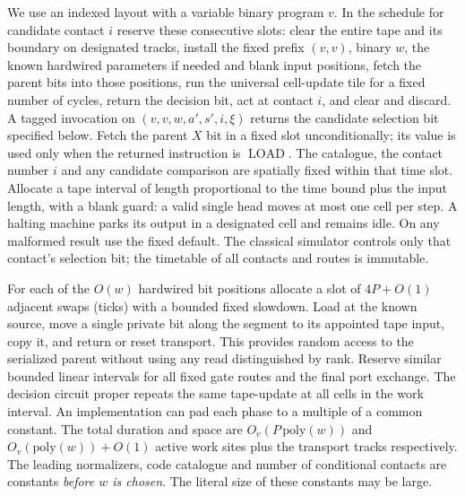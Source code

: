 We use an indexed layout with a variable binary program \(v\). In the schedule for candidate contact \(i\) reserve these consecutive slots: clear the entire tape and its boundary on designated tracks, install the fixed prefix \((v,v)\), binary \(w\), the known hardwired parameters if needed and blank input positions, fetch the parent bits into those positions, run the universal cell-update tile for a fixed number of cycles, return the decision bit, act at contact \(i\), and clear and discard. A tagged invocation on \((v,v,w,a',s',i,\xi)\) returns the candidate selection bit specified below. Fetch the parent \(X\) bit in a fixed slot unconditionally; its value is used only when the returned instruction is \(\operatorname{LOAD}\). The catalogue, the contact number \(i\) and any candidate comparison are spatially fixed within that time slot. Allocate a tape interval of length proportional to the time bound plus the input length, with a blank guard: a valid single head moves at most one cell per step. A halting machine parks its output in a designated cell and remains idle. On any malformed result use the fixed default. The classical simulator controls only that contact's selection bit; the timetable of all contacts and routes is immutable.

For each of the \(O(w)\) hardwired bit positions allocate a slot of \(4P+O(1)\) adjacent swaps (ticks) with a bounded fixed slowdown. Load at the known source, move a single private bit along the segment to its appointed tape input, copy it, and return or reset transport. This provides random access to the serialized parent without using any read distinguished by rank. Reserve similar bounded linear intervals for all fixed gate routes and the final port exchange. The decision circuit proper repeats the same tape-update at all cells in the work interval. An implementation can pad each phase to a multiple of a common constant. The total duration and space are \(O_{v}(P\,\mathrm{poly}(w))\) and \(O_{v}(\mathrm{poly}(w))+O(1)\) active work sites plus the transport tracks respectively. The leading normalizers, code catalogue and number of conditional contacts are constants \emph{before \(w\) is chosen}. The literal size of these constants may be large.

